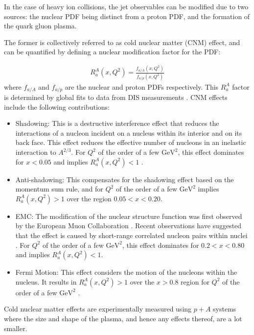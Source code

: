 In the case of heavy ion collisions, the jet observables can be modified due to two sources: the nuclear PDF being distinct from a proton PDF, and the formation of the quark gluon plasma.

The former is collectively referred to as cold nuclear matter (CNM) effect, and can be quantified by defining a nuclear modification factor for the PDF:

\begin{align}
R_a^A (x, Q^2) = \frac{f_{a/A} (x, Q^2)}{f_{a/p}(x, Q^2)}
\end{align}
where $f_{a/A}$ and $f_{a/p}$ are the nuclear and proton PDFs respectively.
This $R_a^A$ factor is determined by global fits to data from DIS measurements \cite{PhysRevC.76.065207, PhysRevD.69.074028, Eskola_2009}.
CNM effects include the following contributions:
\begin{itemize}
\item Shadowing: This is a destructive interference effect that reduces the interactions of a nucleon incident on a nucleus within its interior and on its back face.
This effect reduces the effective number of nucleons in an inelastic interaction to $A^{2/3}$.
For $Q^2$ of the order of a few $\mathrm{GeV}^2$, this effect dominates for $x < 0.05$ and implies $R_a^A (x, Q^2) < 1$  \cite{PhysRevLett.64.1342}.
\item Anti-shadowing: This compensates for the shadowing effect based on the momentum sum rule, and for $Q^2$ of the order of a few $\mathrm{GeV}^2$ implies $R_a^A (x, Q^2) > 1$ over the region $0.05 < x < 0.20$.
\item EMC: The modification of the nuclear structure function was first observed by the European Muon Collaboration \cite{AUBERT1983275}.
Recent observations have suggested that the effect is caused by short-range correlated nucleon pairs within nuclei \cite{PhysRevC.85.047301}.
For $Q^2$ of the order of a few $\mathrm{GeV}^2$, this effect dominates for $0.2 < x < 0.80$ and implies $R_a^A (x, Q^2) < 1$.
\item  Fermi Motion: This effect considers the motion of the nucleons within the nucleus.
It results in $R_a^A (x, Q^2) > 1$  over the $x > 0.8$ region for $Q^2$ of the order of a few $\mathrm{GeV}^2$ \cite{Saito:1985ct}.
\end{itemize}

Cold nuclear matter effects are experimentally measured using $p+A$ systems where the size and shape of the plasma, and hence any effects thereof, are a lot smaller.


